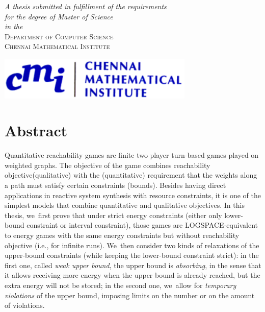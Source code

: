 \documentclass[a4paper, 12pt, twoside]{book}
\theoremstyle{definition}
\begin{document}
\begin{titlepage}
	\textit{A thesis submitted in fulfillment of the requirements\\ for the degree of Master of Science}\\
	\vspace{1\baselineskip}
	\textit{in the}\\
	\vspace{1\baselineskip}
	{\scshape Department of Computer Science\\ Chennai Mathematical Institute}

	\vspace{4\baselineskip}
	
	\includegraphics[width=0.7\textwidth]{cmi.png}

	\vfill %
	
\end{titlepage}


\chapter*{Abstract}
\thispagestyle{empty}
Quantitative reachability games are finite two player turn-based games played on weighted graphs. The objective of the game combines reachability objective(qualitative) with the (quantitative) requirement that the weights along a path must satisfy certain constraints (bounds). Besides having direct applications in reactive system synthesis with resource constraints, it is one of the simplest models that combine quantitative and qualitative objectives.
\vskip 0.5cm
In this thesis, we~first prove that under strict energy constraints (either only
lower-bound constraint or interval constraint), those games are
LOGSPACE-equivalent to energy games with the same energy constraints but without reachability objective (i.e., for infinite
runs). We~then consider two kinds of
relaxations of the upper-bound constraints (while keeping the
lower-bound constraint strict): in the first one, called \emph{weak
upper bound}, the upper bound is \emph{absorbing}, in the sense that
it allows receiving more energy when the upper bound is already
reached, but the extra energy will not be stored; in the second one,
we~allow for \emph{temporary violations} of the upper bound, imposing
limits on the number or on the amount of violations.
\end{document}

